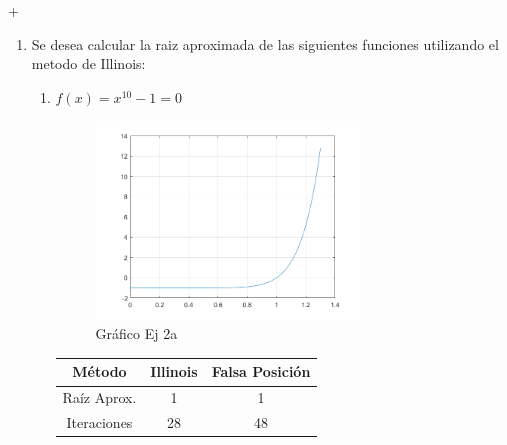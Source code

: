 +\documentclass{udpreport}
\begin{document}
\begin{enumerate}
\begin{enumerate}
    \newpage
    
    
    \end{enumerate}
\newpage
\item  Se desea calcular la raiz aproximada de las siguientes funciones utilizando el metodo de Illinois: 
    	\begin{enumerate}
    	\item  $f(x)= x^{10} - 1 =0$
    	\begin{figure}[H]
            \centering
            \includegraphics[width=7cm]{Ec21.png}
             \caption{Gráfico Ej 2a}
        \end{figure}
        \begin{table}[H]
            \centering
           \begin{tabular} { |c|c|c| }
                \hline
                Método       & Illinois & Falsa Posición  \\
                \hline
                Raíz Aprox. &  1      &    1       \\
                \hline
                Iteraciones   &    28       &    48          \\
                \hline
                \end{tabular}
            \end{table}
        

\end{enumerate}
\end{enumerate}
\end{document}

